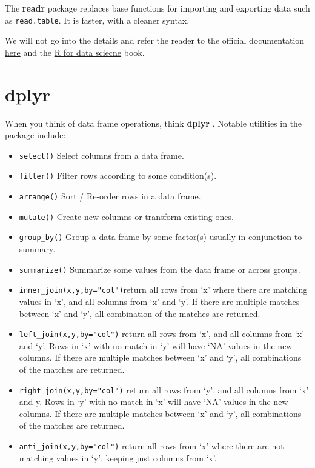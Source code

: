 \documentclass[]{book}
\providecommand{\tightlist}{%
  \setlength{\itemsep}{0pt}\setlength{\parskip}{0pt}}
\theoremstyle{definition}
\theoremstyle{definition}
\theoremstyle{definition}
\theoremstyle{remark}
\begin{document}
The \textbf{readr} package \citep{readr} replaces base functions for
importing and exporting data such as \texttt{read.table}. It is faster,
with a cleaner syntax.

We will not go into the details and refer the reader to the official
documentation
\href{http://readr.tidyverse.org/articles/readr.html}{here} and the
\href{http://r4ds.had.co.nz/data-import.html}{R for data sciecne} book.

\section{dplyr}\label{dplyr}

When you think of data frame operations, think \textbf{dplyr}
\citep{dplyr}. Notable utilities in the package include:

\begin{itemize}
\tightlist
\item
  \texttt{select()} Select columns from a data frame.
\item
  \texttt{filter()} Filter rows according to some condition(s).
\item
  \texttt{arrange()} Sort / Re-order rows in a data frame.
\item
  \texttt{mutate()} Create new columns or transform existing ones.
\item
  \texttt{group\_by()} Group a data frame by some factor(s) usually in
  conjunction to summary.
\item
  \texttt{summarize()} Summarize some values from the data frame or
  across groups.
\item
  \texttt{inner\_join(x,y,by="col")}return all rows from `x' where there
  are matching values in `x', and all columns from `x' and `y'. If there
  are multiple matches between `x' and `y', all combination of the
  matches are returned.
\item
  \texttt{left\_join(x,y,by="col")} return all rows from `x', and all
  columns from `x' and `y'. Rows in `x' with no match in `y' will have
  `NA' values in the new columns. If there are multiple matches between
  `x' and `y', all combinations of the matches are returned.
\item
  \texttt{right\_join(x,y,by="col")} return all rows from `y', and all
  columns from `x' and y. Rows in `y' with no match in `x' will have
  `NA' values in the new columns. If there are multiple matches between
  `x' and `y', all combinations of the matches are returned.
\item
  \texttt{anti\_join(x,y,by="col")} return all rows from `x' where there
  are not matching values in `y', keeping just columns from `x'.
\end{itemize}
\end{document}
